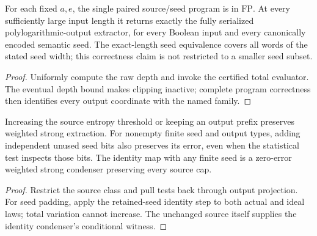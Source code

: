 \begin{theorem}
  \label{thm:lowerbounds-algebraic-polylog-program}
  \leanok
  For each fixed $a,e$, the single paired source/seed program is in
  $\mathrm{FP}$. At every sufficiently large input length it returns
  exactly the fully serialized polylogarithmic-output extractor, for
  every Boolean input and every canonically encoded semantic seed.
  The exact-length seed equivalence covers all words of the stated seed
  width; this correctness claim is not restricted to a smaller seed subset.
\end{theorem}
\begin{proof}
  \leanok
  Uniformly compute the raw depth and invoke the certified total evaluator.
  The eventual depth bound makes clipping inactive; complete program
  correctness then identifies every output coordinate with the named family.
\end{proof}

\begin{theorem}
  \label{thm:lowerbounds-algebraic-strong-projection-padding}
  \leanok
  Increasing the source entropy threshold or keeping an output prefix
  preserves weighted strong extraction. For nonempty finite seed and
  output types, adding independent unused seed bits also preserves its
  error, even when the statistical test inspects those bits.
  The identity map with any finite seed is a zero-error weighted strong
  condenser preserving every source cap.
\end{theorem}
\begin{proof}
  \leanok
  Restrict the source class and pull tests back through output projection.
  For seed padding, apply the retained-seed identity step to both actual
  and ideal laws; total variation cannot increase. The unchanged source
  itself supplies the identity condenser's conditional witness.
\end{proof}

